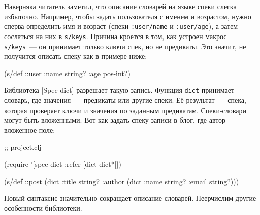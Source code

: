 Наверняка читатель заметил, что описание словарей на языке спеки слегка
избыточно. Например, чтобы задать пользователя с именем и возрастом, нужно
сперва определить имя и возраст (спеки \verb|:user/name| и \verb|:user/age|), а
затем сослаться на них в \verb|s/keys|. Причина кроется в том, как устроен
макрос \verb|s/keys|~--- он принимает только ключи спек, но не предикаты. Это
значит, не получится описать спеку как в примере ниже:

\begin{english}
  \begin{clojure}
(s/def ::user
  {:name string?
   :age pos-int?})
  \end{clojure}
\end{english}

Библиотека [Spec-dict]
разрешает такую запись. Функция \verb|dict| принимает словарь, где значения~--- предикаты
или другие спеки. Её результат~--- спека, которая проверяет ключи и значения
по заданным предикатам. Спеки-словари могут быть вложенными. Вот как задать
спеку записи в блог, где автор~--- вложенное поле:

\begin{english}
  \begin{clojure}
 ;; project.clj

(require '[spec-dict :refer [dict dict*]])

(s/def ::post
  (dict {:title string?
         :author (dict {:name string?
                        :email string?})}))
  \end{clojure}
\end{english}

Новый синтаксис значительно сокращает описание словарей. Пеерчислим другие
особенности библиотеки.

